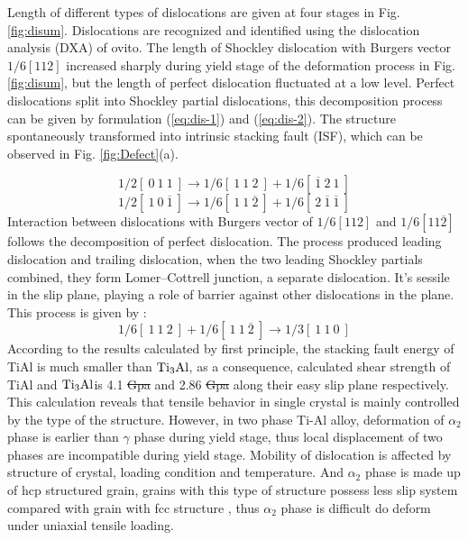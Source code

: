 \documentclass[materials,article,submit,moreauthors,pdftex,10pt,a4paper]{Definitions/mdpi}
\providecommand{\DIFadd}[1]{{\protect\color{blue}\uwave{#1}}} %
\providecommand{\DIFdel}[1]{{\protect\color{red}\sout{#1}}}                      %
\providecommand{\DIFaddbegin}{} %
\providecommand{\DIFaddend}{} %
\providecommand{\DIFdelbegin}{} %
\providecommand{\DIFdelend}{} %
\begin{document}
Length of different types of dislocations are given at four stages in Fig. \ref{fig:disum}. Dislocations are recognized and identified using the dislocation analysis (DXA) of ovito. The length of Shockley dislocation with Burgers vector $1/6[1 1 2]$ increased sharply during yield stage of the deformation process in Fig. \ref{fig:disum}, but the length of perfect dislocation fluctuated at a low level. Perfect  dislocations split into Shockley partial dislocations, this decomposition process  can be given by formulation (\ref{eq:dis-1}) and (\ref{eq:dis-2}). The structure spontaneously transformed into intrinsic stacking fault (ISF), which can be observed in Fig. \ref{fig:Defect}(a). 


\begin{equation}\label{eq:dis-1}
1/2 [\ 0\ 1\ 1\ ] \to 1/6[\ 1\ 1\ 2\ ]+1/6[\ \overline{1}\ 2\ 1\ ]
\end{equation}
\begin{equation}\label{eq:dis-2}
1/2 [\ 1\ 0\ \overline{1}\ ] \to 1/6 [\ 1\ 1\ \overline{2}\ ] + 1/6[\ 2\ \overline{1}\ \overline{1}\ ]
\end{equation}
Interaction between dislocations with Burgers vector of $1/6 [112] $ and $ 1/6 [11\overline{2}]$ follows the decomposition of perfect dislocation. The process produced leading dislocation and trailing dislocation, when the two leading Shockley partials combined, they form Lomer–Cottrell junction, a separate dislocation. It's sessile in the slip plane, playing a role of barrier against other dislocations in the plane. This process is given by :
\begin{equation}\label{eq:dis-3}
1/6 [\ 1\ 1\ 2\ ] + 1/6 [\ 1\ 1\  \overline{2}\ ] \to 1/3 [\ 1\ 1\ 0\ ]
\end{equation}
According to the  results calculated by first principle, the stacking fault energy of TiAl is much smaller than $\rm{Ti_3Al}$, as a consequence, calculated shear strength of TiAl and $\rm{Ti_3Al}$is 4.1 \DIFdelbegin \DIFdel{Gpa }\DIFdelend \DIFaddbegin \DIFadd{GPa }\DIFaddend and 2.86 \DIFdelbegin \DIFdel{Gpa }\DIFdelend \DIFaddbegin \DIFadd{GPa }\DIFaddend along their easy slip plane respectively\cite{Liu2007}. This calculation reveals that tensile behavior in single crystal is mainly controlled by the type of the structure. However, in two phase Ti-Al alloy, deformation of $\alpha_2$ phase is earlier than $\gamma$ phase during yield stage, thus local displacement of two phases are incompatible during yield stage.  Mobility of dislocation is affected by structure of crystal, loading condition and temperature. And $\alpha_2$ phase is made up of hcp  structured grain, grains with this type of structure possess less slip system compared with grain with fcc structure \cite{Zhu2012}, thus $\alpha_2$ phase is difficult do deform under uniaxial tensile loading. 
\end{document}
